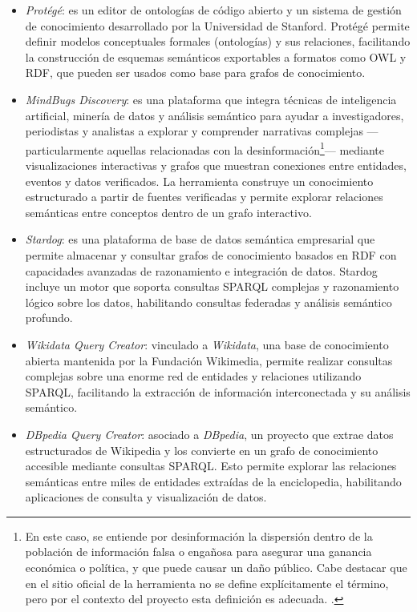 \documentclass{article}
\begin{document}
\begin{itemize}
    \item \textit{Protégé}: es un editor de ontologías de código abierto y un sistema de gestión de conocimiento desarrollado por la Universidad de Stanford. Protégé\cite{protege} permite definir modelos conceptuales formales (ontologías) y sus relaciones, facilitando la construcción de esquemas semánticos exportables a formatos como OWL y RDF, que pueden ser usados como base para grafos de conocimiento. 

   \item \textit{MindBugs Discovery}: es una plataforma que integra técnicas de inteligencia artificial, minería de datos y análisis semántico para ayudar a investigadores, periodistas y analistas a explorar y comprender narrativas complejas —particularmente aquellas relacionadas con la desinformación\footnote{En este caso, se entiende por desinformación la dispersión dentro de la población de información falsa o engañosa para asegurar una ganancia económica o política, y que puede causar un daño público. Cabe destacar que en el sitio oficial de la herramienta no se define explícitamente el término, pero por el contexto del proyecto esta definición es adecuada. \cite{mindbugs2026discovery}.}— mediante visualizaciones interactivas y grafos que muestran conexiones entre entidades, eventos y datos verificados. La herramienta construye un conocimiento estructurado a partir de fuentes verificadas y permite explorar relaciones semánticas entre conceptos dentro de un grafo interactivo.\cite{mindbugs2026discovery}

    \item \textit{Stardog}: es una plataforma de base de datos semántica empresarial que permite almacenar y consultar grafos de conocimiento basados en RDF con capacidades avanzadas de razonamiento e integración de datos. Stardog\cite{stardog} incluye un motor que soporta consultas SPARQL complejas y razonamiento lógico sobre los datos, habilitando consultas federadas y análisis semántico profundo. 
    
    \item \textit{Wikidata Query Creator}: vinculado a \textit{Wikidata}\cite{wikidata}, una base de conocimiento abierta mantenida por la Fundación Wikimedia, permite realizar consultas complejas sobre una enorme red de entidades y relaciones utilizando SPARQL, facilitando la extracción de información interconectada y su análisis semántico.

    \item \textit{DBpedia Query Creator}: asociado a \textit{DBpedia}\cite{dbpedia}, un proyecto que extrae datos estructurados de Wikipedia y los convierte en un grafo de conocimiento accesible mediante consultas SPARQL. Esto permite explorar las relaciones semánticas entre miles de entidades extraídas de la enciclopedia, habilitando aplicaciones de consulta y visualización de datos.


\end{itemize}
\end{document}
